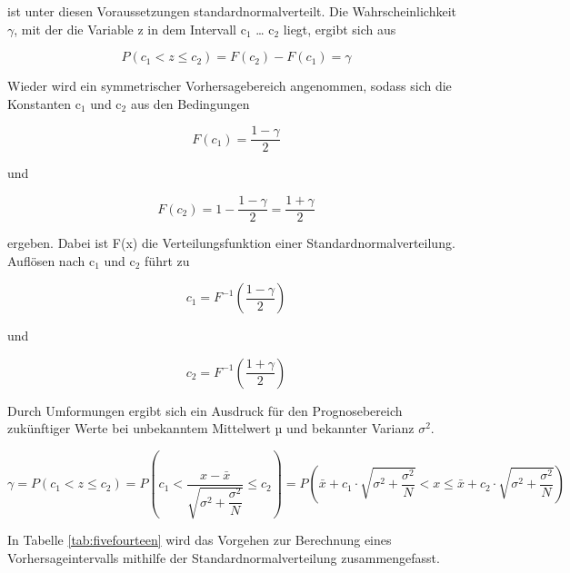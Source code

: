 \noindent ist unter diesen Voraussetzungen standardnormalverteilt. Die Wahrscheinlichkeit $\gamma$, mit der die Variable z in dem Intervall c$_{1}$ {\dots} c$_{2}$ liegt, ergibt sich aus

\begin{equation}\label{eq:fivehundredtwentyfour}
P\left(c_{1} <z\le c_{2} \right)=F\left(c_{2} \right)-F\left(c_{1} \right)=\gamma
\end{equation}

\noindent Wieder wird ein symmetrischer Vorhersagebereich angenommen, sodass sich die Konstanten c$_{1}$ und c$_{2}$ aus den Bedingungen

\begin{equation}\label{eq:fivehundredtwentyfive}
F(c_{1})=\dfrac{1-\gamma }{2}
\end{equation}

\noindent und 

\begin{equation}\label{eq:fivehundredtwentysix}
F(c_{2})=1-\dfrac{1-\gamma}{2} =\dfrac{1+\gamma}{2}
\end{equation}

\noindent ergeben. Dabei ist F(x) die Verteilungsfunktion einer Standardnormalverteilung. Aufl\"{o}sen nach c$_{1}$ und c$_{2}$ f\"{u}hrt zu

\begin{equation}\label{eq:fivehundredtwentyseven}
c_{1} =F^{-1} \left(\dfrac{1-\gamma }{2} \right)
\end{equation}

\noindent und

\begin{equation}\label{eq:fivehundredtwentyeight}
c_{2} =F^{-1} \left(\dfrac{1+\gamma }{2} \right)
\end{equation}

\noindent Durch Umformungen ergibt sich ein Ausdruck f\"{u}r den Prognosebereich zuk\"{u}nftiger Werte bei unbekanntem Mittelwert µ und bekannter Varianz $\sigma^{2}$.

\begin{equation}\label{eq:fivehundredtwentynine}
\gamma =P\left(c_{1} <z\le c_{2} \right)=P\left(c_{1} <\dfrac{x-\bar{x}}{\sqrt{\sigma ^{2} +\dfrac{\sigma ^{2} }{N} } } \le c_{2} \right)=P\left(\bar{x}+c_{1} \cdot \sqrt{\sigma ^{2} +\dfrac{\sigma ^{2} }{N} } <x\le \bar{x}+c_{2} \cdot \sqrt{\sigma ^{2} +\dfrac{\sigma ^{2} }{N} } \right)
\end{equation}

\noindent In Tabelle \ref{tab:fivefourteen} wird das Vorgehen zur Berechnung eines Vorhersageintervalls mithilfe der Standardnormalverteilung zusammengefasst.

